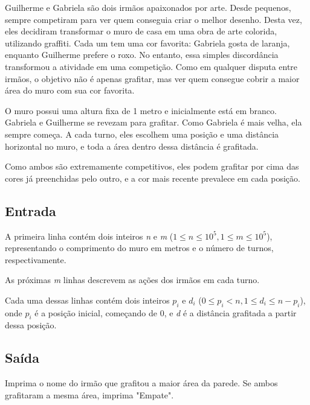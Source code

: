 Guilherme e Gabriela são dois irmãos apaixonados por arte. Desde pequenos, sempre competiram para ver quem conseguia criar o melhor desenho. Desta vez, eles decidiram transformar o muro de casa em uma obra de arte colorida, utilizando graffiti. Cada um tem uma cor favorita: Gabriela gosta de laranja, enquanto Guilherme prefere o roxo. No entanto, essa simples discordância transformou a atividade em uma competição. Como em qualquer disputa entre irmãos, o objetivo não é apenas grafitar, mas ver quem consegue cobrir a maior área do muro com sua cor favorita.

O muro possui uma altura fixa de 1 metro e inicialmente está em branco. Gabriela e Guilherme se revezam para grafitar. Como Gabriela é mais velha, ela sempre começa. A cada turno, eles escolhem uma posição e uma distância horizontal no muro, e toda a área dentro dessa distância é grafitada.

Como ambos são extremamente competitivos, eles podem grafitar por cima das cores já preenchidas pelo outro, e a cor mais recente prevalece em cada posição.

\subsection*{Entrada}

A primeira linha contém dois inteiros \textit{n} e \textit{m} ($1 \leq \textit{n} \leq 10^5, 1 \leq \textit{m} \leq 10^5$), representando o comprimento do muro em metros e o número de turnos, respectivamente.

As próximas \textit{m} linhas descrevem as ações dos irmãos em cada turno.

Cada uma dessas linhas contém dois inteiros \textit{$p_i$} e \textit{$d_i$} ($0 \leq \textit{$p_i$} < \textit{n}, 1 \leq \textit{$d_i$} \leq n - p_i$), onde \textit{$p_i$} é a posição inicial,  começando de 0, e \textit{d} é a distância grafitada a partir dessa posição.

\subsection*{Saída}

Imprima o nome do irmão que grafitou a maior área da parede. Se ambos grafitaram a mesma área, imprima "Empate".

\newpage

